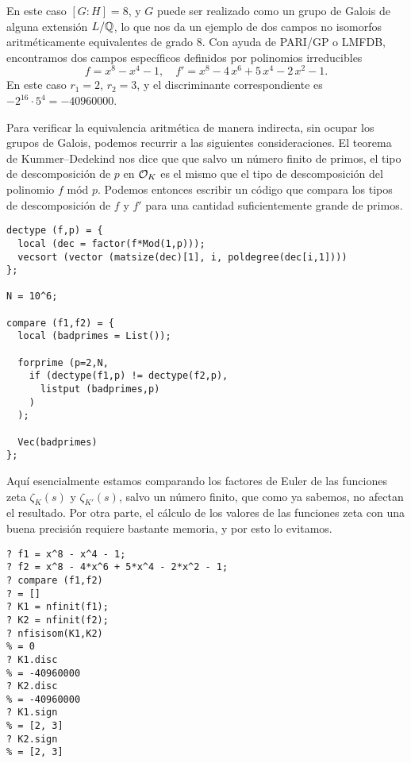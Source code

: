 \begin{ejemplo}
  En este caso $[G:H] = 8$, y $G$ puede ser realizado como un grupo de Galois de
  alguna extensión $L/\mathbb{Q}$, lo que nos da un ejemplo de dos campos no isomorfos
  aritméticamente equivalentes de grado $8$. Con ayuda de PARI/GP o LMFDB,
  encontramos dos campos específicos definidos por polinomios irreducibles
  \[ f = x^8 - x^4 - 1, \quad
    f' = x^8 - 4\,x^6 + 5\,x^4 - 2\,x^2 - 1. \]
  En este caso $r_1 = 2$, $r_2 = 3$, y el discriminante correspondiente es
  $-2^{16}\cdot 5^4 = -40960000$.

  Para verificar la equivalencia aritmética de manera indirecta, sin ocupar los
  grupos de Galois, podemos recurrir a las siguientes consideraciones.
  El teorema de Kummer--Dedekind nos dice que que salvo un número finito de
  primos, el tipo de descomposición de $p$ en $\mathcal{O}_K$ es el mismo que el tipo de
  descomposición del polinomio $f$ mód $p$. Podemos entonces escribir un código
  que compara los tipos de descomposición de $f$ y $f'$ para una cantidad
  suficientemente grande de primos.

  \begin{shaded}\small
\begin{verbatim}
dectype (f,p) = {
  local (dec = factor(f*Mod(1,p)));
  vecsort (vector (matsize(dec)[1], i, poldegree(dec[i,1])))
};

N = 10^6;

compare (f1,f2) = {
  local (badprimes = List());

  forprime (p=2,N,
    if (dectype(f1,p) != dectype(f2,p),
      listput (badprimes,p)
    )
  );

  Vec(badprimes)
};
\end{verbatim}
  \end{shaded}

  Aquí esencialmente estamos comparando los factores de Euler de las funciones
  zeta $\zeta_K (s)$ y $\zeta_{K'} (s)$, salvo un número finito, que como ya
  sabemos, no afectan el resultado. Por otra parte, el cálculo de los valores de
  las funciones zeta con una buena precisión requiere bastante memoria, y por
  esto lo evitamos.

  \begin{shaded}\small
\begin{verbatim}
? f1 = x^8 - x^4 - 1;
? f2 = x^8 - 4*x^6 + 5*x^4 - 2*x^2 - 1;
? compare (f1,f2)
? = []
? K1 = nfinit(f1);
? K2 = nfinit(f2);
? nfisisom(K1,K2)
% = 0
? K1.disc
% = -40960000
? K2.disc
% = -40960000
? K1.sign
% = [2, 3]
? K2.sign
% = [2, 3]
\end{verbatim}
  \end{shaded}
\end{ejemplo}

